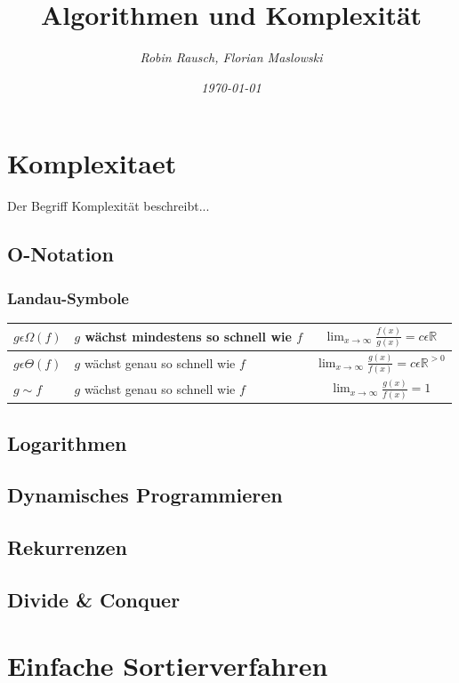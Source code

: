\documentclass[12pt,a4paper]{article}
\author{\slshape Robin Rausch, Florian Maslowski}
\title{Algorithmen und Komplexität}
\date{\slshape \today}
\begin{document}
\maketitle
\tableofcontents
\newpage
\section{Komplexitaet}
Der Begriff Komplexität beschreibt...
\subsection{O-Notation}

\subsubsection{Landau-Symbole}
\begin{tabularx}{\textwidth}{|l|X|c|}
	\hline
	$g  \epsilon  \Omega (f)$ & $g$ wächst mindestens so schnell wie $f$ & $\lim_{x \to \infty} \frac{f(x)}{g(x)} = c \epsilon \mathbb{R}$ \\
	\hline
	$g  \epsilon  \Theta (f)$ & $g$ wächst genau so schnell wie $f$ & $\lim_{x \to \infty} \frac{g(x)}{f(x)} = c \epsilon \mathbb{R}^{>0}$ \\
	\hline
	$g \sim f$ & $g$ wächst genau so schnell wie $f$ & $\lim_{x \to \infty} \frac{g(x)}{f(x)} = 1$ \\
	\hline
\end{tabularx}

\subsection{Logarithmen}

\subsection{Dynamisches Programmieren}

\subsection{Rekurrenzen}

\subsection{Divide \& Conquer}

\section{Einfache Sortierverfahren}
\end{document}
